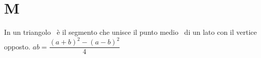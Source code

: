 \chapter{M}
\vspace{5mm}
 In un triangolo\pointsto~ è il segmento che unisce il punto medio\pointsto~ di un lato con il vertice opposto.
$ab=\dfrac{(a+b)^2-(a-b)^2}{4}$ \cite{Derbyshire2011}